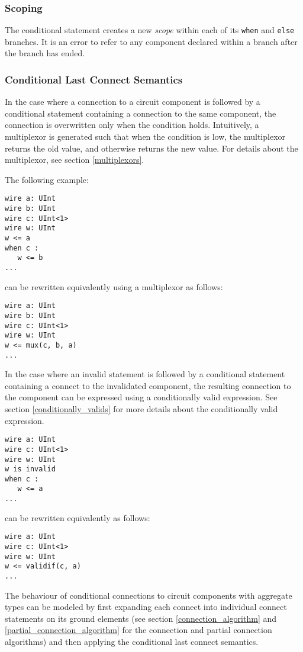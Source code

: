 \documentclass[12pt]{article}
\begin{document}
\subsubsection{Scoping}
The conditional statement creates a new {\em scope} within each of its \verb|when| and \verb|else| branches. It is an error to refer to any component declared within a branch after the branch has ended.

\subsubsection{Conditional Last Connect Semantics}\label{conditional_last_connect}
In the case where a connection to a circuit component is followed by a conditional statement containing a connection to the same component, the connection is overwritten only when the condition holds. Intuitively, a multiplexor is generated such that when the condition is low, the multiplexor returns the old value, and otherwise returns the new value. For details about the multiplexor, see section \ref{multiplexors}.

The following example:
\begin{lstlisting}
wire a: UInt
wire b: UInt
wire c: UInt<1>
wire w: UInt
w <= a
when c :
   w <= b
...   
\end{lstlisting}
can be rewritten equivalently using a multiplexor as follows:
\begin{lstlisting}
wire a: UInt
wire b: UInt
wire c: UInt<1>
wire w: UInt
w <= mux(c, b, a)
...
\end{lstlisting}

In the case where an invalid statement is followed by a conditional statement containing a connect to the invalidated component, the resulting connection to the component can be expressed using a conditionally valid expression. See section \ref{conditionally_valids} for more details about the conditionally valid expression.
\begin{lstlisting}
wire a: UInt
wire c: UInt<1>
wire w: UInt
w is invalid
when c :
   w <= a
...   
\end{lstlisting}
can be rewritten equivalently as follows:
\begin{lstlisting}
wire a: UInt
wire c: UInt<1>
wire w: UInt
w <= validif(c, a)
...
\end{lstlisting}

The behaviour of conditional connections to circuit components with aggregate types can be modeled by first expanding each connect into individual connect statements on its ground elements (see section \ref{connection_algorithm} and \ref{partial_connection_algorithm} for the connection and partial connection algorithms) and then applying the conditional last connect semantics.
\end{document}
